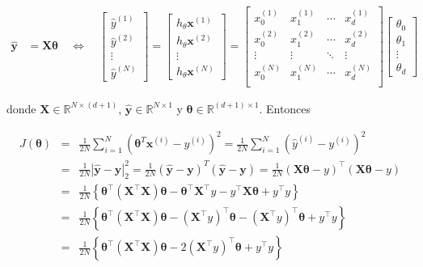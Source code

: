 \documentclass[12pt]{article}
\begin{document}
\begin{eqnarray}
\hat{\textbf{y}} &= \mathbf{X} \mathbf{\theta} \quad \Leftrightarrow \quad 
\begin{bmatrix}
\hat{y}^{(1)} \\
\hat{y}^{(2)} \\
\vdots \\
\hat{y}^{(N)}
\end{bmatrix} =
\begin{bmatrix}
h_{\theta}\mathbf{x}^{(1)} \\
h_{\theta}\mathbf{x}^{(2)} \\
\vdots \\
h_{\theta}\mathbf{x}^{(N)}
\end{bmatrix}= 
\begin{bmatrix}
x_0^{(1)} & x_1^{(1)} & \cdots & x_d^{(1)} \\
x_0^{(2)} & x_1^{(2)} & \cdots & x_d^{(2)} \\
\vdots & \vdots & \ddots & \vdots \\
x_0^{(N)} & x_1^{(N)} & \cdots & x_d^{(N)} \\
\end{bmatrix}
\begin{bmatrix}
\theta_0 \\
\theta_1 \\
\vdots \\
\theta_d
\end{bmatrix}
\end{eqnarray}

donde $\mathbf{X} \in \mathbb{R}^{N \times (d+1)}$, $\hat{\mathbf{y}} \in \mathbb{R}^{N \times 1}$ y $\mathbf{\theta} \in \mathbb{R}^{(d+1) \times 1}$. Entonces

\begin{eqnarray*}
J(\mathbf{\theta}) &=& \frac{1}{2N} \sum_{i=1}^{N} \left( \mathbf{\theta}^{T} \mathbf{x}^{(i)} - y^{(i)} \right)^2 = \frac{1}{2N} \sum_{i=1}^{N} \left( \hat{y}^{(i)} - y^{(i)} \right)^2\\
&=& \frac{1}{2N} | \hat{\mathbf{y}} - \mathbf{y} |_2^2 = \frac{1}{2N} (\hat{\mathbf{y}} - \mathbf{y})^{T} (\hat{\mathbf{y}} - \mathbf{y})=\frac{1}{2N}\left(\mathbf{X}\mathbf{\theta}-y\right)^{\top}\left(\mathbf{X}\mathbf{\theta}-y\right)\\
&=&\frac{1}{2N}\left\{\mathbf{\theta}^{\top}\left(\mathbf{X}^{\top}\mathbf{X}\right)\mathbf{\theta}-\mathbf{\theta}^{\top}\mathbf{X}^{\top}y-y^{\top}\mathbf{X}\mathbf{\theta}+y^{\top}y\right\}\\
&=&\frac{1}{2N}\left\{\mathbf{\theta}^{\top}\left(\mathbf{X}^{\top}\mathbf{X}\right)\mathbf{\theta}-\left(\mathbf{X}^{\top}y\right)^{\top}\mathbf{\theta}-\left(\mathbf{X}^{\top}y\right)^{\top}\mathbf{\theta}+y^{\top}y\right\}\\
&=&\frac{1}{2N}\left\{\mathbf{\theta}^{\top}\left(\mathbf{X}^{\top}\mathbf{X}\right)\mathbf{\theta}-2\left(\mathbf{X}^{\top}y\right)^{\top}\mathbf{\theta}+y^{\top}y\right\}
\end{eqnarray*}
\end{document}
